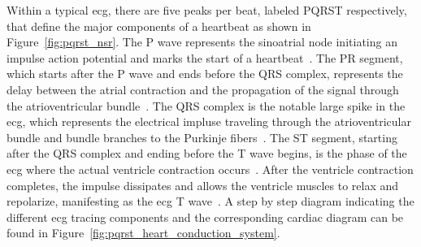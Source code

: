 \documentclass[\main/thesis.tex]{subfiles}
\begin{document}
Within a typical \gls{ecg}, there are five peaks per beat, labeled PQRST respectively, that define the major components of a heartbeat as shown in Figure~\ref{fig:pqrst_nsr}.
The P wave represents the sinoatrial node initiating an impulse action potential and marks the start of a heartbeat~\cite{betts-anatomy-and-physiology}.
The PR segment, which starts after the P wave and ends before the QRS complex, represents the delay between the atrial contraction and the propagation of the signal through the atrioventricular bundle~\cite{betts-anatomy-and-physiology}.
The QRS complex is the notable large spike in the \gls{ecg}, which represents the electrical impluse traveling through the atrioventricular bundle and bundle branches to the Purkinje fibers~\cite{betts-anatomy-and-physiology}.
The ST segment, starting after the QRS complex and ending before the T wave begins, is the phase of the \gls{ecg} where the actual ventricle contraction occurs~\cite{betts-anatomy-and-physiology}.
After the ventricle contraction completes, the impulse dissipates and allows the ventricle muscles to relax and repolarize, manifesting as the \gls{ecg} T wave~\cite{betts-anatomy-and-physiology}.
A step by step diagram indicating the different \gls{ecg} tracing components and the corresponding cardiac diagram can be found in Figure~\ref{fig:pqrst_heart_conduction_system}.
\end{document}
